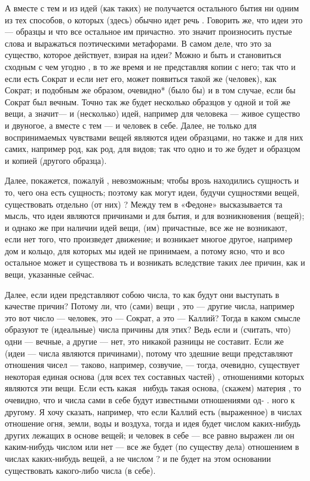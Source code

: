 \documentclass{article}
\begin{document}
А вместе с тем и из идей (как таких)  не получается остального бытия ни одним из тех способов,
\footnotemark[15]
о которых (здесь) обычно идет речь . Говорить же, что идеи это — образцы и что все остальное им причастно. это значит произносить пустые слова и выражаться поэтическими метафорами. В самом деле, что это за существо, которое действует, взирая на идеи? Можно и быть и становиться сходным с чем угодно , в то же время и не представляя копии с него; так что и если есть Сократ и если нет его, может появиться такой же (человек), как Сократ; и подобным же образом, очевидно* (было бы) и в том случае, если бы Сократ был вечным. Точно так же будет несколько образцов у одной и той же вещи, а значит— и (несколько) идей, например для человека — живое существо и двуногое, а вместе с тем — и человек в себе. Далее, не только для воспринимаемых чувствами вещей являются идеи образцами, но также и для них самих, например род, как род, для видов; так что одно и то же будет и образцом и копией (другого образца).

Далее, покажется, пожалуй , невозможным; чтобы врозь находились сущность и то, чего она есть сущность; поэтому как могут идеи, будучи сущностями вещей, существовать отдельно (от них) ? Между тем в «Федоне»
\footnotemark[16]
высказывается та мысль, что идеи являются причинами и для бытия, и для возникновения (вещей); и однако же при наличии идей вещи, (им) причастные, все же не возникают, если нет того, что произведет движение; и возникает многое другое, например дом и кольцо, для которых мы идей не принимаем,
\footnotemark[17]
а потому ясно, что и всо остальное может и существова ть и возникать вследствие таких лее причин, как и вещи, указанные сейчас.
\footnotemark[18]


Далее, если идеи представляют собою числа, то как будут они выступать в качестве причин? Потому ли, что (сами) вещи , это — другие числа, например это вот число — человек, это — Сократ, а это — Каллий? Тогда в каком смысле образуют те (идеальные) числа причины для этих? Ведь если и (считать, что) одни — вечные, а другие — нет, это никакой разницы не составит. Если же (идеи — числа являются причинами), потому что здешние вещи представляют отношения чисел — таково, например, созвучие, — тогда, очевидно, существует некоторая единая основа (для всех тех составных частей)  , отношениями которых являются эти вещи. Если есть какая~ нибудь такая основа, (скажем) материя , то очевидно, что и числа сами в себе  будут известными отношениями од- . ного к другому. Я хочу сказать, например, что если Каллий есть (выраженное) в числах отношение огня, земли, воды и воздуха, тогда и идея будет числом каких-нибудь других лежащих в основе вещей;
\footnotemark[20]
и человек в себе — все равно выражен ли он каким-нибудь числом или нет — все же будет (по существу дела) отношением в числах каких-нибудь вещей, а не числом  ? и пе будет на этом основании существовать какого-либо числа (в себе).
\footnotemark[19]
\end{document}
